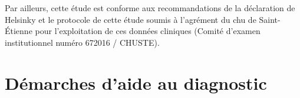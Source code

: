 Par ailleurs, cette étude est conforme aux recommandations de la déclaration de Helsinky et le protocole de cette étude soumis à l'agrément du \gls{chu} de Saint-Étienne pour l'exploitation de ces données cliniques (Comité d'examen institutionnel numéro 672016 / CHUSTE).



\section{Démarches d'aide au diagnostic}
\label{sec:cad_methods}

\cite{Wiltgen2008}
\cite{Halimi2017a}



